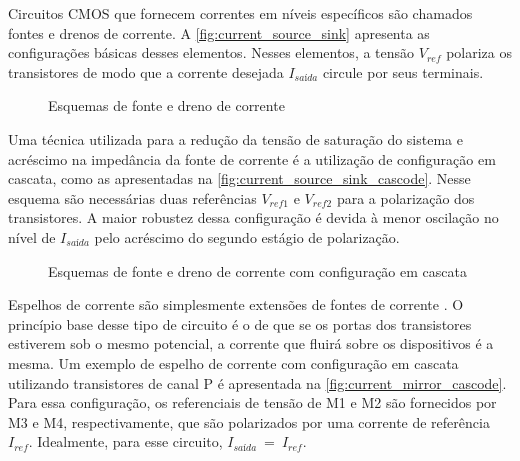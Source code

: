 Circuitos {CMOS} que fornecem correntes em níveis específicos são chamados fontes e drenos de corrente. A \autoref{fig:current_source_sink} apresenta as configurações básicas desses elementos. Nesses elementos, a tensão $V_{ref}$ polariza os transistores de modo que a corrente desejada $I_{saída}$ circule por seus terminais.

\begin{figure}[!htb]
	\caption[Esquemas de fonte e dreno de corrente]{\label{fig:current_source_sink}Esquemas de fonte e dreno de corrente}
	\begin{center}
		\hspace*{0.1\linewidth}
	\end{center}
\end{figure}

Uma técnica utilizada para a redução da tensão de saturação do sistema e acréscimo na impedância da fonte de corrente é a utilização de configuração em cascata, como as apresentadas na \autoref{fig:current_source_sink_cascode}. Nesse esquema são necessárias duas referências $V_{ref1}$ e $V_{ref2}$ para a polarização dos transistores. A maior robustez dessa configuração é devida à menor oscilação no nível de $I_{saída}$ pelo acréscimo do segundo estágio de polarização.

\begin{figure}[!htb]
	\caption{\label{fig:current_source_sink_cascode}Esquemas de fonte e dreno de corrente com configuração em cascata}
	\begin{center}
		\hspace*{0.1\linewidth}
	\end{center}
\end{figure}

Espelhos de corrente são simplesmente extensões de fontes de corrente \cite{ALLEN:2002}. O princípio base desse tipo de circuito é o de que se os portas dos transistores estiverem sob o mesmo potencial, a corrente que fluirá sobre os dispositivos é a mesma. Um exemplo de espelho de corrente com configuração em cascata utilizando transistores de canal P é apresentada na \autoref{fig:current_mirror_cascode}. Para essa configuração, os referenciais de tensão de {M1} e {M2} são fornecidos por {M3} e {M4}, respectivamente, que são polarizados por uma corrente de referência $I_{ref}$. Idealmente, para esse circuito, $I_{saída}~=~I_{ref}$.

